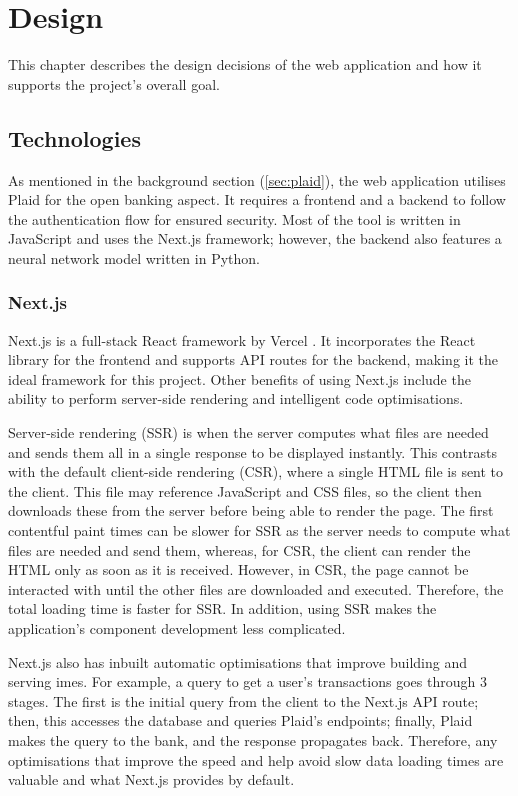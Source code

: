 \chapter{Design}
\label{ch:design}

This chapter describes the design decisions of the web application and how it supports the project's overall goal.

\section{Technologies}
\label{sec:technologies}
As mentioned in the background section (\ref{sec:plaid}), the web application utilises Plaid for the open banking aspect. It requires a frontend and a backend to follow the authentication flow for ensured security. Most of the tool is written in JavaScript and uses the Next.js framework; however, the backend also features a neural network model written in Python.

\subsection{Next.js}
Next.js is a full-stack React framework by Vercel \cite{Next.js}. It incorporates the React library for the frontend and supports API routes for the backend, making it the ideal framework for this project. Other benefits of using Next.js include the ability to perform server-side rendering and intelligent code optimisations.

Server-side rendering (SSR) is when the server computes what files are needed and sends them all in a single response to be displayed instantly. This contrasts with the default client-side rendering (CSR), where a single HTML file is sent to the client. This file may reference JavaScript and CSS files, so the client then downloads these from the server before being able to render the page. The first contentful paint times can be slower for SSR as the server needs to compute what files are needed and send them, whereas, for CSR, the client can render the HTML only as soon as it is received. However, in CSR, the page cannot be interacted with until the other files are downloaded and executed. Therefore, the total loading time is faster for SSR. In addition, using SSR makes the application's component development less complicated.

Next.js also has inbuilt automatic optimisations that improve building and serving imes. For example, a query to get a user's transactions goes through 3 stages. The first is the initial query from the client to the Next.js API route; then, this accesses the database and queries Plaid's endpoints; finally, Plaid makes the query to the bank, and the response propagates back. Therefore, any optimisations that improve the speed and help avoid slow data loading times are valuable and what Next.js provides by default.


